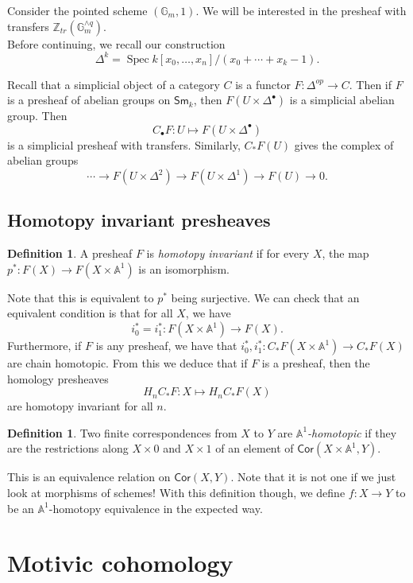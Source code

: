 \documentclass[leqno, openany]{memoir}
\theoremstyle{definition}
\newtheorem{defn}[thm]{Definition}
\theoremstyle{remark}
\theoremstyle{plain}
\theoremstyle{definition}
\theoremstyle{remark}
\newcommand{\A}{\mathbb{A}}
\newcommand{\G}{\mathbb{G}}
\newcommand{\Z}{\mathbb{Z}}
\newcommand{\Sm}{\mathsf{Sm}}
\newcommand{\Cor}{\mathsf{Cor}}
\DeclareMathOperator{\Spec}{Spec}
\begin{document}
Consider the pointed scheme $(\G_m, 1)$.  We will be interested in the presheaf
with transfers $\Z_{tr}(\G_m^{\wedge q})$. \\ 

Before continuing, we recall our construction \[ \Delta^k = \Spec k[x_0,
\ldots, x_n]/(x_0+\cdots +x_k-1).  \] 

Recall that a simplicial object of a category $C$ is a functor
$F:\Delta^{op}\rightarrow C$.  Then if $F$ is a presheaf of abelian groups on
$\Sm_k$, then $F(U\times\Delta^\bullet)$ is a simplicial abelian group.  Then
\[ C_\bullet F: U\mapsto F(U\times \Delta^\bullet) \] is a simplicial presheaf
with transfers.  Similarly, $C_*F(U)$ gives the complex of abelian groups \[
    \cdots\rightarrow F(U\times \Delta^2)\rightarrow F(U\times
    \Delta^1)\rightarrow F(U)\rightarrow 0.  \]

\subsection{Homotopy invariant presheaves}

\begin{defn} A presheaf $F$ is \textit{homotopy invariant} if for every $X$,
the map $p^*:F(X)\rightarrow F(X\times \A^1)$ is an isomorphism.  \end{defn}

Note that this is equivalent to $p^*$ being surjective.  We can check that an
equivalent condition is that for all $X$, we have \[ i_0^*=i_1^*:F(X\times
\A^1)\rightarrow F(X).  \] Furthermore, if $F$ is any presheaf, we have that
$i_0^*, i_1^*:C_*F(X\times \A^1)\rightarrow C_*F(X)$ are chain homotopic.  From
this we deduce that if $F$ is a presheaf, then the homology presheaves \[
H_nC_*F:X\mapsto H_nC_*F(X) \] are homotopy invariant for all $n$. 

\begin{defn} Two finite correspondences from $X$ to $Y$ are
\textit{$\A^1$-homotopic} if they are the restrictions along $X\times 0$ and
$X\times 1$ of an element of $\Cor(X\times \A^1, Y)$.  \end{defn}

This is an equivalence relation on $\Cor(X, Y)$.  Note that it is not one if we
just look at morphisms of schemes!  With this definition though, we define
$f:X\rightarrow Y$ to be an $\A^1$-homotopy equivalence in the expected way.


\section{Motivic cohomology} 
\end{document}
